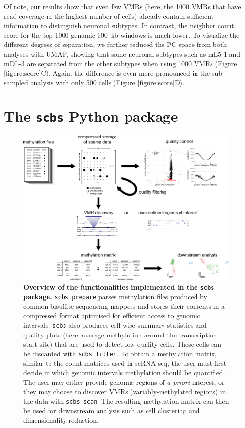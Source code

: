 \documentclass[twocolumn,10pt]{article}
\begin{document}
Of note, our results show that even few VMRs (here, the 1000 VMRs that have read coverage in the highest number of cells) already contain sufficient information to distinguish neuronal subtypes.
In contrast, the neighbor count score for the top 1000 genomic 100~kb windows is much lower.
To visualize the different degrees of separation, we further reduced the PC space from both analyses with UMAP, showing that some neuronal subtypes such as mL5-1 and mDL-3 are separated from the other subtypes when using 1000 VMRs (Figure \ref{figure:score}C).
Again, the difference is even more pronounced in the sub-sampled analysis with only 500 cells (Figure \ref{figure:score}D).

\section{The \texttt{scbs} Python package}

\begin{figure}[t]
	\begin{center}
		\includegraphics[width=.8\textwidth]{figures/Fig_workflow.png}
	\end{center}
	\caption{\small \textbf{Overview of the functionalities implemented in the \texttt{scbs} package.}
		\texttt{scbs prepare} parses methylation files produced by common bisulfite sequencing mappers and stores their contents in a compressed format optimised for efficient access to genomic intervals.
		\texttt{scbs} also produces cell-wise summary statistics and quality plots (here: average methylation around the transcription start site) that are used to detect low-quality cells.
		These cells can be discarded with \texttt{scbs filter}.
		To obtain a methylation matrix, similar to the count matrices used in scRNA-seq, the user must first decide in which genomic intervals methylation should be quantified.
		The user may either provide genomic regions of \emph{a priori} interest, or they may choose to discover VMRs (variably-methylated regions) in the data with \texttt{scbs scan}.
		The resulting methylation matrix can then be used for downstream analysis such as cell clustering and dimensionality reduction.
	}
	\label{workflow}
\end{figure}
\end{document}
